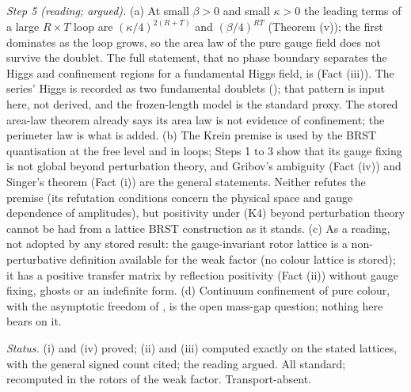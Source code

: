 \emph{Step 5 (reading; argued).} (a) At small $\beta > 0$ and small $\kappa > 0$ the leading terms of a large $R \times T$ loop are $(\kappa/4)^{2(R + T)}$ and $(\beta/4)^{RT}$ (Theorem (v)); the first dominates as the loop grows, so the area law of the pure gauge field does not survive the doublet. The full statement, that no phase boundary separates the Higgs and confinement regions for a fundamental Higgs field, is \cite{FradkinShenker1979} (Fact (iii)). The series' Higgs is recorded as two fundamental doublets (); that pattern is input here, not derived, and the frozen-length model is the standard proxy. The stored area-law theorem already says its area law is not evidence of confinement; the perimeter law is what is added. (b) The Krein premise is used by the BRST quantisation at the free level and in loops; Steps 1 to 3 show that its gauge fixing is not global beyond perturbation theory, and Gribov's ambiguity (Fact (iv)) and Singer's theorem \cite{Singer1978} (Fact (i)) are the general statements. Neither refutes the premise (its refutation conditions concern the physical space and gauge dependence of amplitudes), but positivity under (K4) beyond perturbation theory cannot be had from a lattice BRST construction as it stands. (c) As a reading, not adopted by any stored result: the gauge-invariant rotor lattice is a non-perturbative definition available for the weak factor (no colour lattice is stored); it has a positive transfer matrix by reflection positivity (Fact (ii)) without gauge fixing, ghosts or an indefinite form. (d) Continuum confinement of pure colour, with the asymptotic freedom of , is the open mass-gap question; nothing here bears on it.

\emph{Status.} (i) and (iv) proved; (ii) and (iii) computed exactly on the stated lattices, with the general signed count cited; the reading argued. All standard; recomputed in the rotors of the weak factor. Transport-absent.
